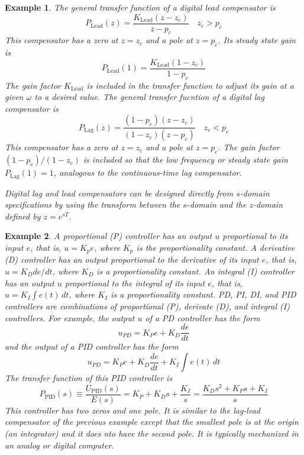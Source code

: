 \documentclass[11pt]{book}
\theoremstyle{example}
\newtheorem{example}{Example}[section]
\begin{document}
\begin{example}
	The general transfer function of a digital lead compensator is
	\begin{equation}
		P_\mathrm{Lead}(z)=\frac{K_\mathrm{Lead}(z-z_c)}{z-p_c}\quad{z_c>p_c}
	\end{equation}
	This compensator has a zero at $z=z_c$ and a pole at $z=p_c$. Its steady state gain is
	\begin{equation}
		P_\mathrm{Lead}(1)=\frac{K_\mathrm{Lead}(1-z_c)}{1-p_c}
	\end{equation}
	The gain factor $K_\mathrm{Lead}$ is included in the transfer function to adjust its gain at a given $\omega$ to a desired value. The general transfer fucntion of a digital lag compensator is
	\begin{equation}
		P_\mathrm{Lag}(z)=\frac{(1-p_c)(z-z_c)}{(1-z_c)(z-p_c)}\quad{z_c<p_c}
	\end{equation}
	This compensator has a zero at $z=z_c$ and a pole at $z=p_c$. The gain factor $(1-p_c)/(1-z_c)$ is included so that the low frequency or steady state gain $P_\mathrm{Lag}(1)=1$, analogous to the continuous-time lag compensator.

	Digital lag and lead compensators can be designed directly from $s$-domain specifications by using the transform between the $s$-domain and the $z$-domain defined by $z=e^{sT}$.
\end{example}


\begin{example}
	A proportional (P) controller has an output $u$ proportional to its input $e$, that is, $u=K_pe$, where $K_p$ is the proportionality constant. A derivative (D) controller has an output proportional to the derivative of its input $e$, that is, $u=K_Dde/dt$, where $K_D$ is a proportionality constant. An integral (I) controller has an output $u$ proportional to the integral of its input $e$, that is, $u=K_I\int{e(t)\,dt}$, where $K_I$ is a proportionality constant.  PD, PI, DI, and PID controllers are combinations of proportional (P), derivate (D), and integral (I) controllers. For example, the output $u$ of a PD controller has the form
	\begin{equation}
		u_{PD}=K_Pe+K_D\frac{de}{dt}
	\end{equation}
and the output of a PID controller has the form
	\begin{equation}
		u_{PD}=K_Pe+K_D\frac{de}{dt}+K_I\int{e(t)\,dt}
	\end{equation}
	The transfer function of this PID controller is
	\begin{equation}
		P_\mathrm{PID}(s)\equiv\frac{U_\mathrm{PID}(s)}{E(s)}=K_P+K_Ds+\frac{K_I}{s}=\frac{K_Ds^2+K_Ps+K_I}{s}
	\end{equation}
	This controller has two zeros and one pole. It is similar to the lag-lead compensator of the previous example except that the smallest pole is at the origin (an integrator) and it does nto have the second pole. It is typically mechanized in an analog or digital computer. 
\end{example}
\end{document}
